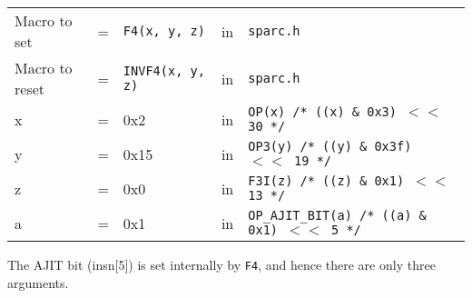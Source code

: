 \begin{enumerate}
  \begin{tabular}[h]{lclcl}
    Macro to set  &=& \texttt{F4(x, y, z)} &in& \texttt{sparc.h}     \\
    Macro to reset  &=& \texttt{INVF4(x, y, z)} &in& \texttt{sparc.h}     \\
    x &=& 0x2      &in& \texttt{OP(x)  /* ((x) \& 0x3)  $<<$ 30 */} \\
    y &=& 0x15     &in& \texttt{OP3(y) /* ((y) \& 0x3f) $<<$ 19 */} \\
    z &=& 0x0      &in& \texttt{F3I(z) /* ((z) \& 0x1)  $<<$ 13 */} \\
    a &=& 0x1      &in& \texttt{OP\_AJIT\_BIT(a) /* ((a) \& 0x1)  $<<$ 5 */}
  \end{tabular}

  The AJIT bit  (insn[5]) is set internally by  \texttt{F4}, and hence
  there are only three arguments.

\end{enumerate}

